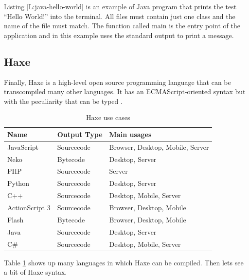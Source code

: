 \begin{codefigure}
\end{codefigure}

Listing \ref{L:java-hello-world} is an example of Java program that prints the
test “Hello World!” into the terminal. All files must contain just one class and
the name of the file must match. The function called main is the entry point of the application and in this example uses the standard output to print a message.

\subsection{Haxe}

Finally, Haxe is a high-level open source programming language that can be 
transcompiled many other languages. It has an ECMAScript-oriented syntax but 
with the peculiarity that can be typed \cite{what-is-haxe}. 

\begin{table}[htb]
\begin{center}
\begin{tabular}{|l|l|l|}
\hline
{\bf Name }		& {\bf Output Type} & {\bf Main usages}  \\ \hline \hline
JavaScript		& Sourcecode		& Browser, Desktop, Mobile, Server \\ \hline
Neko			& Bytecode			& Desktop, Server   \\ \hline
PHP				& Sourcecode		& Server   \\ \hline
Python			& Sourcecode		& Desktop, Server   \\ \hline
C++				& Sourcecode		& Desktop, Mobile, Server   \\ \hline
ActionScript 3	& Sourcecode		& Browser, Desktop, Mobile   \\ \hline
Flash			& Bytecode			& Browser, Desktop, Mobile   \\ \hline
Java			& Sourcecode		& Desktop, Server   \\ \hline
C\#				& Sourcecode		& Desktop, Mobile, Server   \\ \hline
\end{tabular}
\caption{Haxe use cases \cite{what-is-haxe}}
\label{T:haxe-use-cases}
\end{center}
\end{table}

Table \ref{T:haxe-use-cases} shows up many languages in which Haxe can be
compiled. Then lets see a bit of Haxe syntax.


